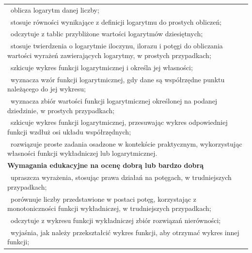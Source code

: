\documentclass[12pt,a4paper]{article}
\begin{document}
\begin{longtable}{|p{16cm}|}
		\textbullet\ oblicza logarytm danej liczby; \\
		
		\textbullet\ stosuje równości wynikające z definicji logarytmu do prostych obliczeń; \\
		
		\textbullet\ odczytuje z tablic przybliżone wartości logarytmów dziesiętnych; \\
		
		\textbullet\ stosuje twierdzenia o logarytmie iloczynu, ilorazu i potęgi do obliczania wartości wyrażeń zawierających logarytmy, w prostych przypadkach; \\
		
		\textbullet\ szkicuje wykres funkcji logarytmicznej i określa jej własności; \\
		
		\textbullet\ wyznacza wzór funkcji logarytmicznej, gdy dane są współrzędne punktu należącego do jej wykresu; \\
		
		\textbullet\ wyznacza zbiór wartości funkcji logarytmicznej określonej na podanej dziedzinie, w prostych przypadkach; \\
		
		\textbullet\ szkicuje wykres funkcji logarytmicznej, przesuwając wykres odpowiedniej funkcji wzdłuż osi układu współrzędnych; \\
		
		\textbullet\ rozwiązuje proste zadania osadzone w kontekście praktycznym, wykorzystując własności funkcji wykładniczej lub logarytmicznej. \\ \hline
		
		\textbf{Wymagania edukacyjne na ocenę dobrą lub bardzo dobrą} \\ \hline
		
		\textbullet\ upraszcza wyrażenia, stosując prawa działań na potęgach, w trudniejszych przypadkach; \\
		
		\textbullet\ porównuje liczby przedstawione w postaci potęg, korzystając z monotoniczności funkcji wykładniczej, w trudniejszych przypadkach; \\
		
		\textbullet\ odczytuje z wykresu funkcji wykładniczej zbiór rozwiązań nierówności; \\
		
		\textbullet\ wyjaśnia, jak należy przekształcić wykres funkcji, aby otrzymać wykres innej funkcji; \\
		

\end{longtable}
\end{document}
